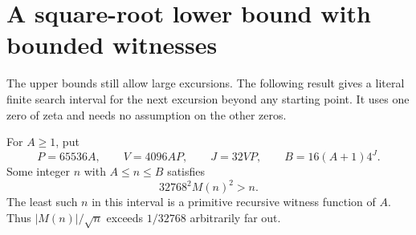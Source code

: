 \section{A square-root lower bound with bounded witnesses}\label{sec:omega}
The upper bounds still allow large excursions. The following result gives a
literal finite search interval for the next excursion beyond any starting
point. It uses one zero of zeta and needs no assumption on the other zeros.

\begin{theorem}\label{thm:sqrt-lower}
For $A\ge1$, put
\[
 P=65536A,\qquad V=4096 AP,\qquad J=32VP,\qquad B=16(A+1)4^J.
\]
Some integer $n$ with $A\le n\le B$ satisfies
\[
                     32768^2 M(n)^2>n.
\]
The least such $n$ in this interval is a primitive recursive witness function
of $A$. Thus $|M(n)|/\sqrt n$ exceeds $1/32768$ arbitrarily far out.
\end{theorem}
